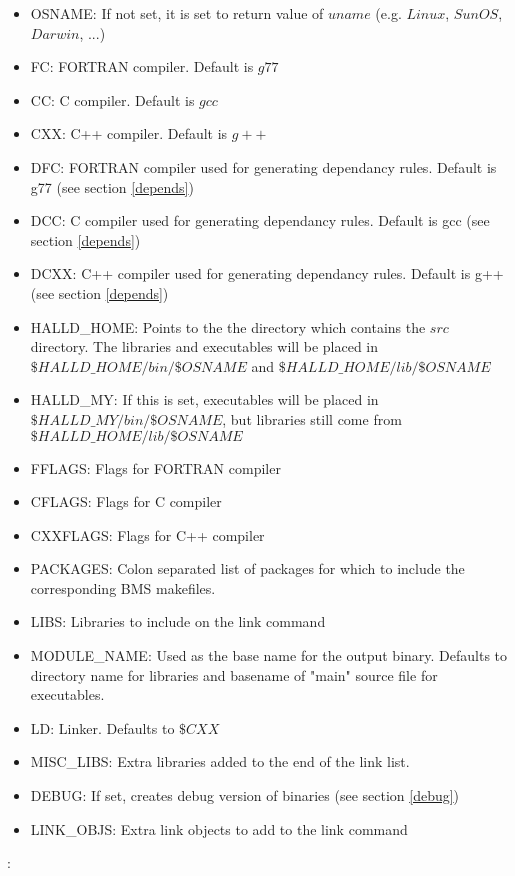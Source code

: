 \documentclass[12pt]{article}
\begin{document}
\begin{itemize}
\item{OSNAME}: If not set, it is set to return value of $uname$ (e.g.
 $Linux$, $SunOS$, $Darwin$, ...)
\item{FC}: FORTRAN compiler. Default is $g77$
\item{CC}: C compiler. Default is $gcc$
\item{CXX}: C++ compiler. Default is $g++$
\item{DFC}: FORTRAN compiler used for generating dependancy rules.
  Default is g77 (see section \ref{depends})
\item{DCC}: C compiler used for generating dependancy rules.
  Default is gcc (see section \ref{depends})
\item{DCXX}: C++ compiler used for generating dependancy rules.
  Default is g++ (see section \ref{depends})
\item{HALLD\_HOME}: Points to the the directory which contains the
  $src$ directory. The libraries and executables will be placed
  in $\$HALLD\_HOME/bin/\$OSNAME$ and $\$HALLD\_HOME/lib/\$OSNAME$
\item{HALLD\_MY}: If this is set, executables will be placed in
  $\$HALLD\_MY/bin/\$OSNAME$, but libraries still come from
  $\$HALLD\_HOME/lib/\$OSNAME$
\item{FFLAGS}: Flags for FORTRAN compiler
\item{CFLAGS}: Flags for C compiler
\item{CXXFLAGS}: Flags for C++ compiler
\item{PACKAGES}: Colon separated list of packages for which to
  include the corresponding BMS makefiles.
\item{LIBS}: Libraries to include on the link command
\item{MODULE\_NAME}: Used as the base name for the output
  binary. Defaults to directory name for libraries and basename
  of "main" source file for executables.
\item{LD}: Linker. Defaults to $\$CXX$
\item{MISC\_LIBS}: Extra libraries added to the end of the link list.
\item{DEBUG}: If set, creates debug version of binaries (see
  section \ref{debug})
\item{LINK\_OBJS}: Extra link objects to add to the link command
\end{itemize}:

\end{document}
